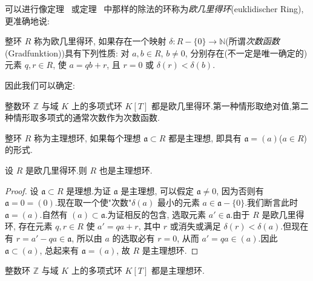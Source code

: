 可以进行像定理~ 或定理~ 中那样的除法的环称为\emph{欧几里得环}(\textup{euklidischer Ring}), 更准确地说:

\begin{definition}[欧几里得环]\label{def:5.2.3}
整环 $R$ 称为欧几里得环, 如果存在一个映射 $\delta \colon R - \{0\} \longrightarrow \mathbb{N}$(所谓\emph{次数函数}(\textup{Gradfunktion}))具有下列性质: 对 $a, b \in R$, $b \neq 0$, 分别存在(不一定是唯一确定的)元素 $q, r \in R$, 使 $a = qb + r$, 且 $r = 0$ 或 $\delta(r) < \delta(b)$.
\end{definition}

因此我们可以确定:

\begin{corollary}\label{cor:5.2.4}
整数环 $\mathbb{Z}$ 与域 $K$ 上的多项式环 $K[T]$ 都是欧几里得环.第一种情形取绝对值,第二种情形取多项式的通常次数作为次数函数.
\end{corollary}

\begin{definition}\label{def:5.2.5}
整环 $R$ 称为主理想环, 如果每个理想 $\mathfrak{a} \subset R$ 都是主理想, 即具有 $\mathfrak{a} = (a)$($a \in R$)的形式.
\end{definition}

\begin{theorem}\label{thm:5.2.6}
设 $R$ 是欧几里得环.则 $R$ 也是主理想环.
\end{theorem}

\begin{proof}
设 $\mathfrak{a} \subset R$ 是理想.为证 $\mathfrak{a}$ 是主理想, 可以假定 $\mathfrak{a} \neq 0$, 因为否则有 $\mathfrak{a} = 0 = (0)$.现在取一个使"次数"$\delta(a)$ 最小的元素 $a \in \mathfrak{a} - \{0\}$.我们断言此时 $\mathfrak{a} = (a)$.自然有 $(a) \subset \mathfrak{a}$.为证相反的包含, 选取元素 $a' \in \mathfrak{a}$.由于 $R$ 是欧几里得环, 存在元素 $q, r \in R$ 使 $a' = qa + r$, 其中 $r$ 或消失或满足 $\delta(r) < \delta(a)$.但现在有 $r = a' - qa \in \mathfrak{a}$, 所以由 $a$ 的选取必有 $r = 0$, 从而 $a' = qa \in (a)$.因此 $\mathfrak{a} \subset (a)$, 总起来有 $\mathfrak{a} = (a)$, 故 $R$ 是主理想环.
\end{proof}

\begin{corollary}\label{cor:5.2.7}
整数环 $\mathbb{Z}$ 与域 $K$ 上的多项式环 $K[T]$ 都是主理想环.
\end{corollary}

